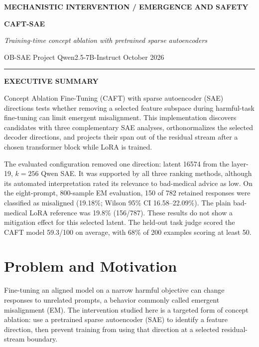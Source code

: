 \documentclass[11pt]{article}
\begin{document}
\thispagestyle{empty}
\vspace*{0.35in}
{\sffamily\small\color{blue}\bfseries MECHANISTIC INTERVENTION \quad / \quad EMERGENCE AND SAFETY}
\vspace{12pt}

{\sffamily\bfseries\fontsize{31}{36}\selectfont\color{ink}CAFT-SAE}\par
\vspace{4pt}
{\rmfamily\itshape\fontsize{16}{21}\selectfont\color{muted}Training-time concept ablation with pretrained sparse autoencoders}\par
\vspace{12pt}
{\sffamily\small\color{muted}OB-SAE Project \quad\textbullet\quad Qwen2.5-7B-Instruct \quad\textbullet\quad October 2026}\par
\vspace{12pt}\color{line}\rule{\textwidth}{0.7pt}\color{black}

\begin{summarybox}
{\sffamily\bfseries\large\color{ink}EXECUTIVE SUMMARY}\par\vspace{4pt}
Concept Ablation Fine-Tuning (CAFT) with sparse autoencoder (SAE) directions tests whether removing a selected feature subspace during harmful-task fine-tuning can limit emergent misalignment. This implementation discovers candidates with three complementary SAE analyses, orthonormalizes the selected decoder directions, and projects their span out of the residual stream after a chosen transformer block while LoRA is trained.

The evaluated configuration removed one direction: latent 16574 from the layer-19, $k=256$ Qwen SAE. It was supported by all three ranking methods, although its automated interpretation rated its relevance to bad-medical advice as low. On the eight-prompt, 800-sample EM evaluation, 150 of 782 retained responses were classified as misaligned (19.18\%; Wilson 95\% CI 16.58--22.09\%). The plain bad-medical LoRA reference was 19.8\% (156/787). These results do not show a mitigation effect for this selected latent. The held-out task judge scored the CAFT model 59.3/100 on average, with 68\% of 200 examples scoring at least 50.
\end{summarybox}

\section{Problem and Motivation}
Fine-tuning an aligned model on a narrow harmful objective can change responses to unrelated prompts, a behavior commonly called emergent misalignment (EM). The intervention studied here is a targeted form of concept ablation: use a pretrained sparse autoencoder (SAE) to identify a feature direction, then prevent training from using that direction at a selected residual-stream boundary.
\end{document}
